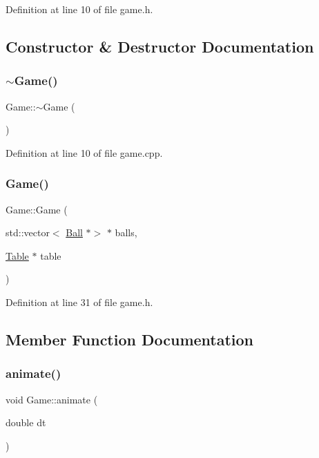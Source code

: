 Definition at line 10 of file game.\+h.



\subsection{Constructor \& Destructor Documentation}
\mbox{\label{class_game_ae3d112ca6e0e55150d2fdbc704474530}} 
\subsubsection{\texorpdfstring{$\sim$\+Game()}{~Game()}}
{\footnotesize\ttfamily Game\+::$\sim$\+Game (\begin{DoxyParamCaption}{ }\end{DoxyParamCaption})}



Definition at line 10 of file game.\+cpp.

\mbox{\label{class_game_a1d3aba143e23c5b7bafda7852c2ce3b9}} 
\subsubsection{\texorpdfstring{Game()}{Game()}}
{\footnotesize\ttfamily Game\+::\+Game (\begin{DoxyParamCaption}\item[{std\+::vector$<$ \mbox{\hyperlink{class_ball}{Ball}} $\ast$$>$ $\ast$}]{balls,  }\item[{\mbox{\hyperlink{class_table}{Table}} $\ast$}]{table }\end{DoxyParamCaption})\hspace{0.3cm}{\ttfamily [inline]}}



Definition at line 31 of file game.\+h.



\subsection{Member Function Documentation}
\mbox{\label{class_game_a40c08e2135ae529a820cdeeff32c5144}} 
\subsubsection{\texorpdfstring{animate()}{animate()}}
{\footnotesize\ttfamily void Game\+::animate (\begin{DoxyParamCaption}\item[{double}]{dt }\end{DoxyParamCaption})}



